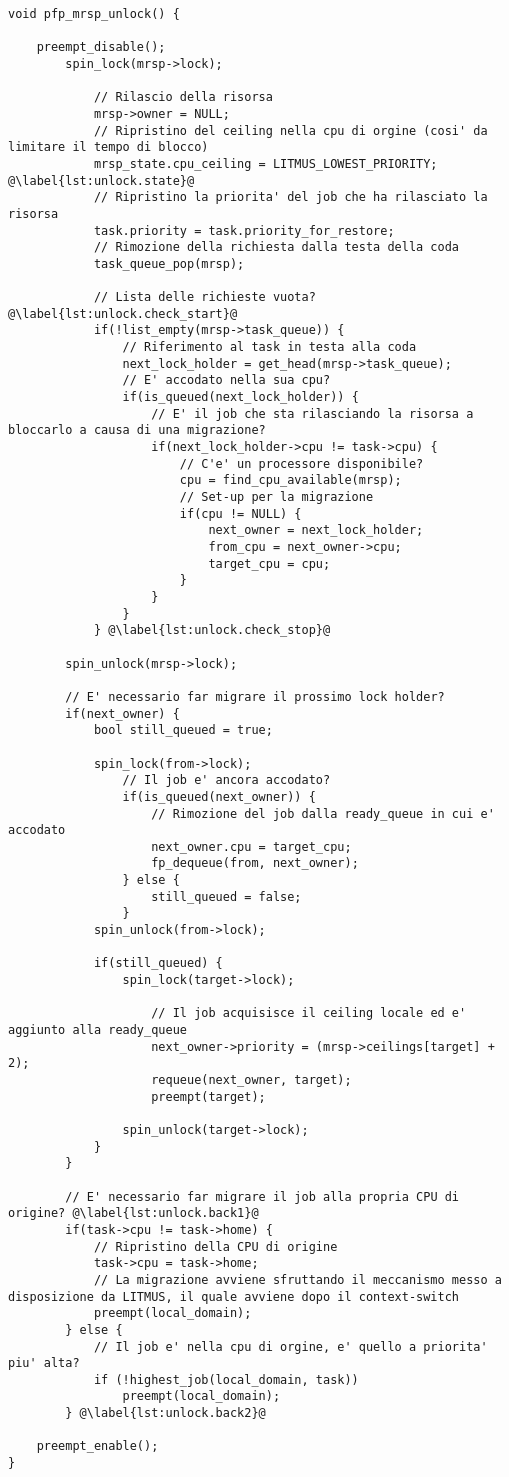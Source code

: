 \begin{lstlisting}
void pfp_mrsp_unlock() {

	preempt_disable();
		spin_lock(mrsp->lock);
			
			// Rilascio della risorsa
			mrsp->owner = NULL;
			// Ripristino del ceiling nella cpu di orgine (cosi' da limitare il tempo di blocco)
			mrsp_state.cpu_ceiling = LITMUS_LOWEST_PRIORITY; @\label{lst:unlock.state}@
			// Ripristino la priorita' del job che ha rilasciato la risorsa
			task.priority = task.priority_for_restore;
			// Rimozione della richiesta dalla testa della coda
			task_queue_pop(mrsp);

			// Lista delle richieste vuota? @\label{lst:unlock.check_start}@
			if(!list_empty(mrsp->task_queue)) {
				// Riferimento al task in testa alla coda
				next_lock_holder = get_head(mrsp->task_queue);
				// E' accodato nella sua cpu?
				if(is_queued(next_lock_holder)) {
					// E' il job che sta rilasciando la risorsa a bloccarlo a causa di una migrazione?
					if(next_lock_holder->cpu != task->cpu) {	
						// C'e' un processore disponibile?
						cpu = find_cpu_available(mrsp);
						// Set-up per la migrazione
						if(cpu != NULL) {
							next_owner = next_lock_holder;
							from_cpu = next_owner->cpu;
							target_cpu = cpu;
						}
					}
				}
			} @\label{lst:unlock.check_stop}@

		spin_unlock(mrsp->lock);

		// E' necessario far migrare il prossimo lock holder?
		if(next_owner) {
			bool still_queued = true;

			spin_lock(from->lock);
				// Il job e' ancora accodato?
				if(is_queued(next_owner)) {
					// Rimozione del job dalla ready_queue in cui e' accodato
					next_owner.cpu = target_cpu;
					fp_dequeue(from, next_owner);
				} else {
					still_queued = false;
				}
			spin_unlock(from->lock);

			if(still_queued) {
				spin_lock(target->lock);

					// Il job acquisisce il ceiling locale ed e' aggiunto alla ready_queue
					next_owner->priority = (mrsp->ceilings[target] + 2);
					requeue(next_owner, target);
					preempt(target);

				spin_unlock(target->lock);
			}
		}

		// E' necessario far migrare il job alla propria CPU di origine? @\label{lst:unlock.back1}@
		if(task->cpu != task->home) {
			// Ripristino della CPU di origine
			task->cpu = task->home;
			// La migrazione avviene sfruttando il meccanismo messo a disposizione da LITMUS, il quale avviene dopo il context-switch
			preempt(local_domain);
		} else {
			// Il job e' nella cpu di orgine, e' quello a priorita' piu' alta?
			if (!highest_job(local_domain, task))
				preempt(local_domain);
		} @\label{lst:unlock.back2}@

	preempt_enable();
}
\end{lstlisting}

